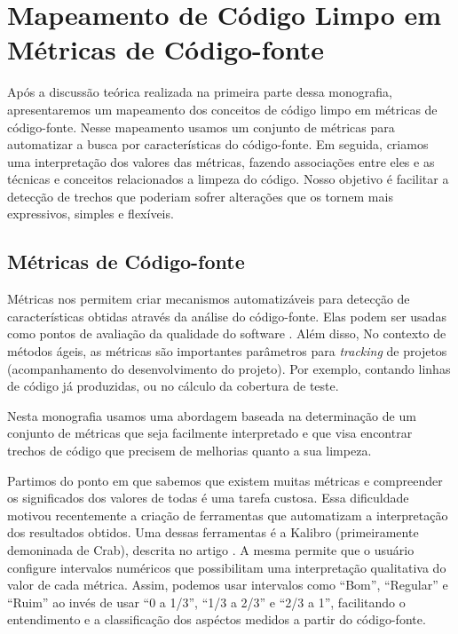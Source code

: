 \chapter{Mapeamento de Código Limpo em Métricas de Código-fonte}
\label{chap:mapeamento}	

Após a discussão teórica realizada na primeira parte dessa 	monografia, apresentaremos um mapeamento dos conceitos de código limpo em métricas de código-fonte. Nesse mapeamento usamos um conjunto de métricas para automatizar a busca por características do código-fonte. Em seguida, criamos uma interpretação dos valores das métricas, fazendo associações entre eles e as técnicas e conceitos relacionados a limpeza do código. Nosso objetivo é facilitar a detecção de trechos que poderiam sofrer alterações que os tornem mais expressivos, simples e flexíveis.


\section{Métricas de Código-fonte}

Métricas nos permitem criar mecanismos automatizáveis para detecção de características obtidas através da análise do código-fonte. Elas podem ser usadas como pontos de avaliação da qualidade do software \citep{meirelles:sbqs09}. Além disso, No contexto de métodos ágeis, as métricas são importantes parâmetros para \textit{tracking} de projetos (acompanhamento do desenvolvimento do projeto). Por exemplo, contando linhas de código já produzidas, ou no cálculo da cobertura de teste.	
                                                                                       
Nesta monografia usamos uma abordagem baseada na determinação de um conjunto de métricas que seja facilmente interpretado e que visa encontrar trechos de código que precisem de melhorias quanto a sua limpeza.

Partimos do ponto em que sabemos que existem muitas métricas e compreender os significados dos valores de todas é uma tarefa custosa. Essa dificuldade motivou recentemente a criação de ferramentas que automatizam a interpretação dos resultados obtidos. Uma dessas ferramentas é a Kalibro (primeiramente demoninada de Crab), descrita no artigo \citep{meirelles:sbes09}. A mesma permite que o usuário configure intervalos numéricos que possibilitam uma interpretação qualitativa do valor de cada métrica. Assim, podemos usar intervalos como ``Bom'', ``Regular'' e ``Ruim'' ao invés de usar ``0 a 1/3'', ``1/3 a 2/3'' e ``2/3 a 1'', facilitando o entendimento e a classificação dos aspéctos medidos a partir do código-fonte.

